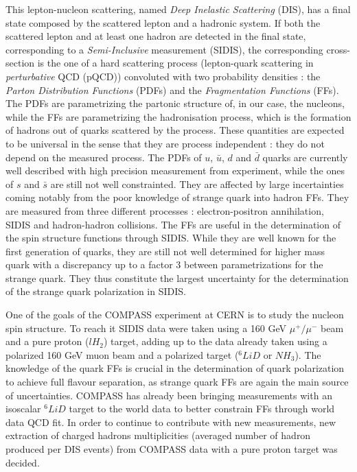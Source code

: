 This lepton-nucleon scattering, named \textit{Deep Inelastic Scattering} (DIS), has a final state composed by the scattered lepton and a hadronic system. If both the scattered lepton and at least one hadron are detected in the final state, corresponding to a \textit{Semi-Inclusive} measurement (SIDIS), the corresponding cross-section is the one of a hard scattering process (lepton-quark scattering in \textit{perturbative} QCD (pQCD)) convoluted with two probability densities : the \textit{Parton Distribution Functions} (PDFs) and the \textit{Fragmentation Functions} (FFs). The PDFs are parametrizing the partonic structure of, in our case, the nucleons, while the FFs are parametrizing the hadronisation process, which is the formation of hadrons out of quarks scattered by the process. These quantities are expected to be universal in the sense that they are process independent : they do not depend on the measured process. The PDFs of $u$, $\bar{u}$, $d$ and $\bar{d}$ quarks are currently well described with high precision measurement from experiment, while the ones of $s$ and $\bar{s}$ are still not well constrainted. They are affected by large incertainties coming notably from the poor knowledge of strange quark into hadron FFs. They are measured from three different processes : electron-positron annihilation, SIDIS and hadron-hadron collisions. The FFs are useful in the determination of the spin structure functions through SIDIS. While they are well known for the first generation of quarks, they are still not well determined for higher mass quark with a discrepancy up to a factor 3 between parametrizations for the strange quark. They thus constitute the largest uncertainty for the determination of the strange quark polarization in SIDIS.

One of the goals of the COMPASS experiment at CERN is to study the nucleon spin structure. To reach it SIDIS data were taken using a 160 GeV $\mu^+/\mu^-$ beam and a pure proton ($lH_2$) target, adding up to the data already taken using a polarized 160 GeV muon beam and a polarized target ($^6LiD$ or $NH_3$). The knowledge of the quark FFs is crucial in the determination of quark polarization to achieve full flavour separation, as strange quark FFs are again the main source of uncertainties\cite{COMPASSstrange}. COMPASS has already been bringing measurements with an isoscalar $^6LiD$ target to the world data to better constrain FFs through world data QCD fit. In order to continue to contribute with new measurements, new extraction of charged hadrons multiplicities (averaged number of hadron produced per DIS events) from COMPASS data with a pure proton target was decided.

